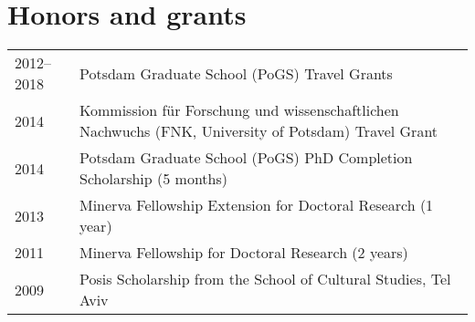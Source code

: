 \documentclass[]{article}
\begin{document}
\hypertarget{honors-and-grants}{%
\section{Honors and grants}\label{honors-and-grants}}

\begin{longtable}[]{@{}ll@{}}
\toprule
\endhead
\begin{minipage}[t]{0.25\columnwidth}\raggedright
2012--2018\strut
\end{minipage} & \begin{minipage}[t]{0.69\columnwidth}\raggedright
Potsdam Graduate School (PoGS) Travel Grants\strut
\end{minipage}\tabularnewline
\begin{minipage}[t]{0.25\columnwidth}\raggedright
2014\strut
\end{minipage} & \begin{minipage}[t]{0.69\columnwidth}\raggedright
Kommission für Forschung und wissenschaftlichen Nachwuchs (FNK,
University of Potsdam) Travel Grant\strut
\end{minipage}\tabularnewline
\begin{minipage}[t]{0.25\columnwidth}\raggedright
2014\strut
\end{minipage} & \begin{minipage}[t]{0.69\columnwidth}\raggedright
Potsdam Graduate School (PoGS) PhD Completion Scholarship (5
months)\strut
\end{minipage}\tabularnewline
\begin{minipage}[t]{0.25\columnwidth}\raggedright
2013\strut
\end{minipage} & \begin{minipage}[t]{0.69\columnwidth}\raggedright
Minerva Fellowship Extension for Doctoral Research (1 year)\strut
\end{minipage}\tabularnewline
\begin{minipage}[t]{0.25\columnwidth}\raggedright
2011\strut
\end{minipage} & \begin{minipage}[t]{0.69\columnwidth}\raggedright
Minerva Fellowship for Doctoral Research (2 years)\strut
\end{minipage}\tabularnewline
\begin{minipage}[t]{0.25\columnwidth}\raggedright
2009\strut
\end{minipage} & \begin{minipage}[t]{0.69\columnwidth}\raggedright
Posis Scholarship from the School of Cultural Studies, Tel Aviv

\end{minipage}
\end{longtable}
\end{document}
